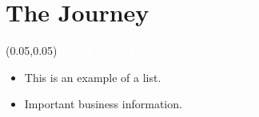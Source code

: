 \documentclass[aspectratio=169]{beamer} %
\begin{document}

\section{The Journey}

\begin{frame}{}
    \setlength{\TPHorizModule}{\textwidth}
    \setlength{\TPVertModule}{\textwidth}
    \begin{textblock}{0.74}(0.05,0.05)
        \bfseries\large\textcolor{white}{What Have I Gotten Myself Into?}
    \end{textblock}
    \begin{itemize}
        \item This is an example of a list.
        \item Important business information.
    \end{itemize}
\end{frame}
\end{document}
